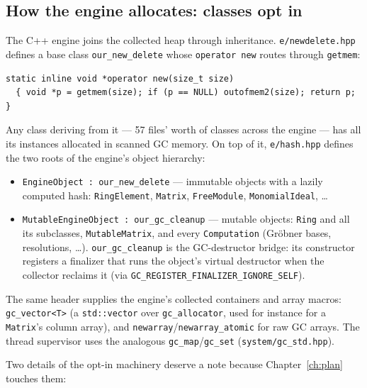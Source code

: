 \documentclass[11pt,oneside]{report}
\newcommand{\code}[1]{\textcolor{m2code}{\texttt{#1}}}
\newcommand{\file}[1]{\textcolor{m2file}{\texttt{#1}}}
\begin{document}
\subsection{How the engine allocates: classes opt in}
\label{sec:optin}

The C++ engine joins the collected heap through inheritance.
\file{e/newdelete.hpp} defines a base class \code{our\_new\_delete} whose
\code{operator new} routes through \code{getmem}:

\begin{lstlisting}
static inline void *operator new(size_t size)
  { void *p = getmem(size); if (p == NULL) outofmem2(size); return p; }
\end{lstlisting}

\noindent Any class deriving from it --- 57 files' worth of classes across
the engine --- has all its instances allocated in scanned GC memory. On top
of it, \file{e/hash.hpp} defines the two roots of the engine's object
hierarchy:

\begin{itemize}
\item \code{EngineObject : our\_new\_delete} --- immutable objects with a
  lazily computed hash: \code{RingElement}, \code{Matrix},
  \code{FreeModule}, \code{MonomialIdeal}, \ldots
\item \code{MutableEngineObject : our\_gc\_cleanup} --- mutable objects:
  \code{Ring} and all its subclasses, \code{MutableMatrix}, and every
  \code{Computation} (Gr\"obner bases, resolutions, \ldots).
  \code{our\_gc\_cleanup} is the GC-destructor bridge: its constructor
  registers a finalizer that runs the object's virtual destructor when the
  collector reclaims it (via
  \code{GC\_REGISTER\_FINALIZER\_IGNORE\_SELF}).
\end{itemize}

The same header supplies the engine's collected containers and array macros:
\code{gc\_vector<T>} (a \code{std::vector} over \code{gc\_allocator}, used
for instance for a \code{Matrix}'s column array), and
\code{newarray}/\code{newarray\_atomic} for raw GC arrays. The thread
supervisor uses the analogous \code{gc\_map}/\code{gc\_set}
(\file{system/gc\_std.hpp}).

Two details of the opt-in machinery deserve a note because
Chapter~\ref{ch:plan} touches them:
\end{document}
